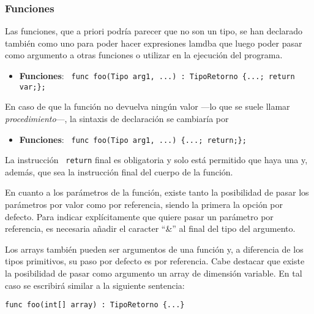 \documentclass[10pt,a4paper]{article}
\begin{document}
\subsubsection{Funciones}
Las funciones, que a priori podría parecer que no son un tipo, se han declarado también como uno para poder hacer expresiones lamdba que luego poder pasar como argumento a otras funciones o utilizar en la ejecución del programa. 
\begin{itemize}
    \item \textbf{Funciones}: \texttt{\color{blue} func foo(Tipo arg1, ...) : TipoRetorno \{...; return var;\};}
\end{itemize}
En caso de que la función no devuelva ningún valor ---lo que se suele llamar \textit{procedimiento}---, la sintaxis de declaración se cambiaría por
\begin{itemize}
    \item \textbf{Funciones}: \texttt{\color{blue} func foo(Tipo arg1, ...) \{...; return;\};}
\end{itemize}

La instrucción \texttt{\color{blue} return} final es obligatoria y solo está permitido que haya una y, además, que sea la instrucción final del cuerpo de la función.

En cuanto a los parámetros de la función, existe tanto la posibilidad de pasar los parámetros por valor como por referencia, siendo la primera la opción por defecto. Para indicar explícitamente que quiere pasar un parámetro por referencia, es necesaria añadir el caracter ``\&'' al final del tipo del argumento.

Los arrays también pueden ser argumentos de una función y, a diferencia de los tipos primitivos, su paso por defecto es por referencia. Cabe destacar que existe la posibilidad de pasar como argumento un array de dimensión variable. En tal caso se escribirá similar a la siguiente sentencia: 
\begin{center}
    \texttt{\color{blue}func foo(int[] array) : TipoRetorno \{...\}}
\end{center}
\end{document}
